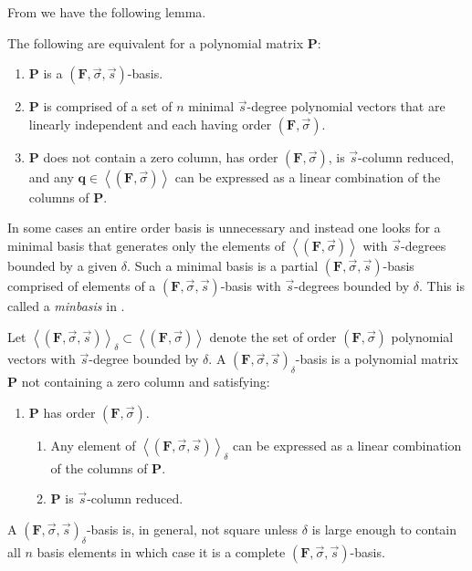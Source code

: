 From \citep{BL1997} we have the following lemma. 
\begin{lem}
\label{lem:orderBasisEquivalence}The following are equivalent for
a polynomial matrix \textbf{$\mathbf{P}$}: 
\begin{enumerate}
\item $\mathbf{P}$ is a $\left(\mathbf{F},\vec{\sigma},\vec{s}\right)$-basis. 
\item $\mathbf{P}$ is comprised of a set of $n$ minimal $\vec{s}$-degree
polynomial vectors that are linearly independent and each having order
$\left(\mathbf{F},\vec{\sigma}\right)$. 
\item $\mathbf{P}$ does not contain a zero column, has order $\left(\mathbf{F},\vec{\sigma}\right)$,
is $\vec{s}$-column reduced, and any $\mathbf{q}\in\left\langle \left(\mathbf{F},\vec{\sigma}\right)\right\rangle $
can be expressed as a linear combination of the columns of $\mathbf{P}$.

\end{enumerate}
\end{lem}
In some cases an entire order basis is unnecessary and instead one
looks for a minimal basis that generates only the elements of $\left\langle \left(\mathbf{F},\vec{\sigma}\right)\right\rangle $
with $\vec{s}$-degrees bounded by a given $\delta$. Such a minimal
basis is a partial $\left(\mathbf{F},\vec{\sigma},\vec{s}\right)$-basis
comprised of elements of a $\left(\mathbf{F},\vec{\sigma},\vec{s}\right)$-basis
with $\vec{s}$-degrees bounded by $\delta$. This is called a \emph{minbasis}
in \citet{Storjohann:2006}. 
\begin{defn}
\label{def:genset} Let $\left\langle \left(\mathbf{F},\vec{\sigma},\vec{s}\right)\right\rangle _{\delta}\subset\left\langle \left(\mathbf{F},\vec{\sigma}\right)\right\rangle $
denote the set of order $\left(\mathbf{F},\vec{\sigma}\right)$ polynomial
vectors with $\vec{s}$-degree bounded by $\delta$. A $\left(\mathbf{F},\vec{\sigma},\vec{s}\right)_{\delta}$-basis
is a polynomial matrix $\mathbf{P}$ not containing a zero column
and satisfying: \end{defn}
\begin{enumerate}
\item $\mathbf{P}$ has order $\left(\mathbf{F},\vec{\sigma}\right).$ 

\begin{enumerate}
\item Any element of $\left\langle \left(\mathbf{F},\vec{\sigma},\vec{s}\right)\right\rangle _{\delta}$
can be expressed as a linear combination of the columns of $\mathbf{P}$. 
\item $\mathbf{P}$ is $\vec{s}$-column reduced. 
\end{enumerate}
\end{enumerate}
\begin{comment}
As before, the linear combination here is in fact unique. 
\end{comment}
A $\left(\mathbf{F},\vec{\sigma},\vec{s}\right)_{\delta}$-basis is,
in general, not square unless $\delta$ is large enough to contain
all $n$ basis elements in which case it is a complete $\left(\mathbf{F},\vec{\sigma},\vec{s}\right)$-basis.


